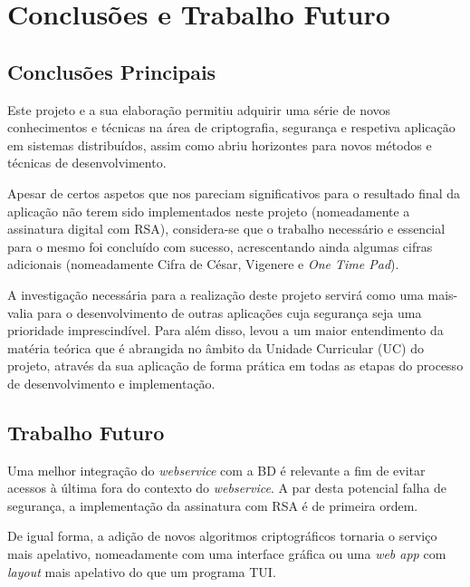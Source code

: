 \chapter{Conclusões e Trabalho Futuro}
\label{chap:conc-trab-futuro}

\section{Conclusões Principais}
\label{sec:conc-princ}

Este projeto e a sua elaboração permitiu adquirir uma série de novos conhecimentos e técnicas na área de criptografia, segurança e respetiva aplicação em sistemas distribuídos, assim como abriu horizontes para novos métodos e técnicas de desenvolvimento.

Apesar de certos aspetos que nos pareciam significativos para o resultado final da aplicação não terem sido implementados neste projeto (nomeadamente a assinatura digital com \ac{RSA}), considera-se que o trabalho necessário e essencial para o mesmo foi concluído com sucesso, acrescentando ainda algumas cifras adicionais (nomeadamente Cifra de César, Vigenere e \textit{One Time Pad}).

A investigação necessária para a realização deste projeto servirá como uma mais-valia para o desenvolvimento de outras aplicações cuja segurança seja uma prioridade imprescindível. Para além disso, levou a um maior entendimento da matéria teórica que é abrangida no âmbito da Unidade Curricular (UC) do projeto, através da sua aplicação de forma prática em todas as etapas do processo de desenvolvimento e implementação.



\section{Trabalho Futuro}
\label{sec:trab-futuro}

Uma melhor integração do \textit{webservice} com a \acl{BD} é relevante a fim de evitar acessos à última fora do contexto do \textit{webservice}. A par desta potencial falha de segurança, a implementação da assinatura com \ac{RSA} é de primeira ordem.

De igual forma, a adição de novos algoritmos criptográficos tornaria o serviço mais apelativo, nomeadamente com uma interface gráfica ou uma \textit{web app} com \textit{layout} mais apelativo do que um programa \acf{TUI}.

